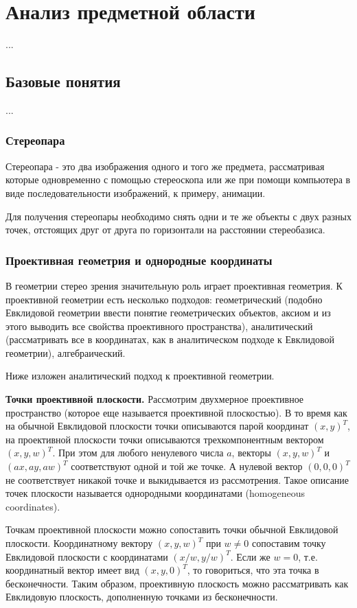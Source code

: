 \chapter{Анализ предметной области}
...
\section{Базовые понятия}
...
\subsection{Стереопара}
Стереопара - это два изображения одного и того
же предмета, рассматривая которые одновременно с
помощью стереоскопа или же при помощи компьютера в виде последовательности изображений, к примеру, анимации.

Для получения стереопары необходимо снять одни и те же объекты с двух разных точек, отстоящих друг от друга по горизонтали на расстоянии стереобазиса.

\subsection{Проективная геометрия и однородные координаты}
В геометрии стерео зрения значительную роль играет проективная геометрия. К проективной геометрии есть несколько подходов: геометрический (подобно Евклидовой геометрии ввести понятие геометрических объектов, аксиом и из этого выводить все свойства проективного пространства), аналитический (рассматривать все в координатах, как в аналитическом подходе к Евклидовой геометрии), алгебраический.

Ниже изложен аналитический подход к проективной геометрии.

\textbf{Точки проективной плоскости.} Рассмотрим двухмерное проективное пространство (которое еще называется проективной плоскостью). В то время как на обычной Евклидовой плоскости точки описываются парой координат $(x,y)^T$, на проективной плоскости точки описываются трехкомпонентным вектором $(x,y,w)^T$. При этом для любого ненулевого числа $a$, векторы $(x,y,w)^T$ и $(ax, ay, aw)^T$ соответствуют одной и той же точке. А нулевой вектор $(0,0,0)^T$ не соответствует никакой точке и выкидывается из рассмотрения. Такое описание точек плоскости называется однородными координатами (homogeneous coordinates).

Точкам проективной плоскости можно сопоставить точки обычной Евклидовой плоскости. Координатному вектору $(x,y,w)^T$ при $w \neq 0$ сопоставим точку Евклидовой плоскости с координатами $(x/w, y/w)^T$. Если же $w = 0$, т.е. координатный вектор имеет вид $(x, y, 0)^T$, то говориться, что эта точка в бесконечности. Таким образом, проективную плоскость можно рассматривать как Евклидовую плоскость, дополненную точками из бесконечности.

